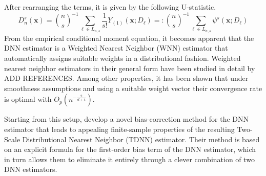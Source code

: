 \documentclass[letterpaper,10pt]{article}
\numberwithin{equation}{section}
\numberwithin{theorem}{section}
\theoremstyle{definition}
\newcommand{\1}{\mathbb{1}}
\begin{document}
After rearranging the terms, it is given by the following U-statistic.
\begin{equation}
	D_{n}^{s}(\mathbf{x})
	= \binom{n}{s}^{-1} \sum_{\ell \in L_{n,s}} \frac{1}{s!} Y_{(1)}(\mathbf{x}; D_{\ell})
	=: \binom{n}{s}^{-1} \sum_{\ell \in L_{n,s}} \psi^{s}(\mathbf{x}; D_{\ell})
\end{equation}
From the empirical conditional moment equation, it becomes apparent that the DNN estimator is a Weighted Nearest Neighbor (WNN) estimator that automatically assigns suitable weights in a distributional fashion.
Weighted nearest neighbor estimators in their general form have been studied in detail by {\color{red} ADD REFERENCES}.
Among other properties, it has been shown that under smoothness assumptions and using a suitable weight vector their convergence rate is optimal with $O_p(n^{-\frac{2}{d+4}}).$

Starting from this setup, \citet{demirkaya_optimal_2024} develop a novel bias-correction method for the DNN estimator that leads to appealing finite-sample properties of the resulting Two-Scale Distributional Nearest Neighbor (TDNN) estimator.
Their method is based on an explicit formula for the first-order bias term of the DNN estimator, which in turn allows them to eliminate it entirely through a clever combination of two DNN estimators.
\end{document}
